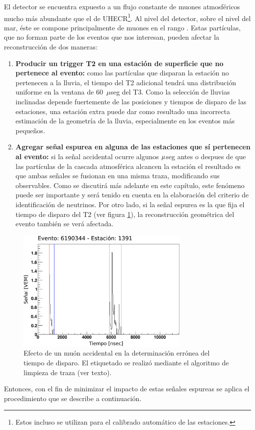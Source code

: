 		El detector se encuentra expuesto a un flujo constante de muones atmosféricos mucho más abundante que el de UHECR\footnote{Estos incluso se utilizan para el calibrado automático de las estaciones.}. 
		Al nivel del detector,  sobre el nivel del mar, éste se compone principalmente de muones en el rango . 
		Estas partículas, que no forman parte de los eventos que nos interesan, pueden afectar la reconstrucción de dos maneras:
		\begin{enumerate}
		\item \textbf{Producir un trigger T2 en una estación de superficie que no pertenece al evento:} como las partículas que disparan la estación no pertenecen a la lluvia, el tiempo del T2 adicional tendrá una distribución uniforme en la ventana de 60~$\mu$seg del T3. Como la selección de lluvias inclinadas depende fuertemente de las posiciones y tiempos de disparo de las estaciones, una estación extra puede dar como resultado una incorrecta estimación de la geometría de la lluvia, especialmente en los eventos más pequeños.

		\item \textbf{Agregar señal espurea en alguna de las estaciones que sí pertenecen al evento:} si la señal accidental ocurre algunos $\rm\mu$seg antes o despues de que las partículas de la cascada atmosférica alcancen la estación el resultado es que ambas señales se fusionan en una misma traza, modificando sus observables.
		Como se discutirá más adelante en este capítulo, este fen\'omeno puede ser importante y será tenido en cuenta en la elaboración del criterio de identificación de neutrinos. 
		Por otro lado, si la señal espurea es la que fija el tiempo de disparo del T2 (ver figura \ref{fig:trazaMalTiempo}), la reconstrucción geométrica del evento también se verá afectada.
		\end{enumerate}
		\begin{figure}[ht]
		\begin{center}
		\includegraphics[width=0.75\textwidth]{fig/seleccionAuger/badStartTime.pdf}
		\caption{Efecto de un muón accidental en la determinación errónea del tiempo de disparo. El etiquetado se realizó mediante el algoritmo de limpieza de traza (ver texto).}
		\label{fig:trazaMalTiempo}
		\end{center}
		\end{figure}
		Entonces, con el fin de minimizar el impacto de estas señales espureas se aplica el procedimiento que se describe a continuaci\'on.
		
